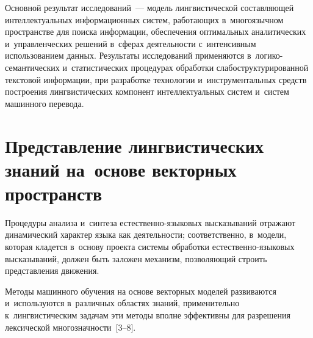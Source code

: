 \begin{multicols}{2}
Основной результат исследований~--- модель 
лингвистической со\-став\-ля\-ющей интеллектуальных информационных сис\-тем, 
работающих в~многоязычном пространстве для поиска информации, 
обеспечения оптимальных аналитических и~управ\-лен\-че\-ских решений 
в~сферах деятельности с~интенсивным использованием данных. Результаты 
исследований применяются в~ло\-ги\-ко-се\-ман\-ти\-че\-ских 
и~статистических процедурах обработки слабоструктурированной текс\-то\-вой 
информации, при разработке технологии и~инструментальных средств 
построения лингвистических компонент интеллектуальных сис\-тем и~сис\-тем 
машинного перевода.
     
    \section{Представление лингвистических знаний на~основе 
векторных пространств }
    
     Процедуры анализа и~синтеза ес\-те\-ст\-вен\-но-язы\-ко\-вых высказываний 
отражают динамический характер языка как деятельности; соответственно, 
в~модели, которая кладется в~основу проекта сис\-те\-мы обработки  
ес\-те\-ст\-вен\-но-язы\-ко\-вых высказываний, дол\-жен быть заложен 
механизм, позволяющий строить пред\-став\-ле\-ния движения. 
     
     Методы машинного обучения на основе векторных моделей 
развиваются и~используются в~различных областях знаний, применительно 
к~лингвистическим задачам эти методы вполне эффективны для разрешения 
лексической мно\-го\-знач\-ности~[3--8]. 
     

\end{multicols}
